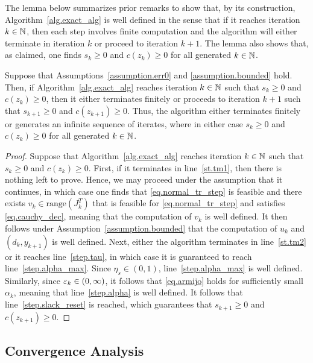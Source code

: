The lemma below summarizes prior remarks to show that, by its construction, Algorithm~\ref{alg.exact_alg} is well defined in the sense that if it reaches iteration $k \in \mathbb{N}$, then each step involves finite computation and the algorithm will either terminate in iteration $k$ or proceed to iteration $k+1$.  The lemma also shows that, as claimed, one finds $s_k \geq 0$ and $c(z_k) \geq 0$ for all generated $k \in \mathbb{N}$.
\begin{lemma}
  Suppose that Assumptions~\ref{assumption.err0} and \ref{assumption.bounded} hold.  Then, if Algorithm~\ref{alg.exact_alg} reaches iteration $k \in \mathbb{N}$ such that $s_k \geq 0$ and $c(z_k) \geq 0$, then it either terminates finitely or proceeds to iteration $k+1$ such that $s_{k+1} \geq 0$ and $c(z_{k+1}) \geq 0$.  Thus, the algorithm either terminates finitely or generates an infinite sequence of iterates, where in either case $s_k \geq 0$ and $c(z_k) \geq 0$ for all generated $k \in \mathbb{N}$. 
\end{lemma}
\begin{proof}
  Suppose that Algorithm~\ref{alg.exact_alg} reaches iteration $k \in \mathbb{N}$ such that $s_k \geq 0$ and $c(z_k) \geq 0$.  First, if it terminates in line~\ref{st.tm1}, then there is nothing left to prove.  Hence, we may proceed under the assumption that it continues, in which case one finds that \eqref{eq.normal_tr_step} is feasible and there exists $v_k \in \text{range}(J_k^T)$ that is feasible for \eqref{eq.normal_tr_step} and satisfies \eqref{eq.cauchy_dec}, meaning that the computation of $v_k$ is well defined.  It then follows under Assumption~\ref{assumption.bounded} that the computation of $u_k$ and $(d_k,y_{k+1})$ is well defined.  Next, either the algorithm terminates in line~\ref{st.tm2} or it reaches line~\ref{step.tau}, in which case it is guaranteed to reach line~\ref{step.alpha_max}.  Since $\eta_s \in (0,1)$, line~\ref{step.alpha_max} is well defined.  Similarly, since $\varepsilon_k \in (0,\infty)$, it follows that \eqref{eq.armijo} holds for sufficiently small~$\alpha_k$, meaning that line~\ref{step.alpha} is well defined.  It follows that line~\ref{step.slack_reset} is reached, which guarantees that $s_{k+1} \geq 0$ and $c(z_{k+1}) \geq 0$.
\end{proof}

\subsection{Convergence Analysis}\label{sec.convergence}

